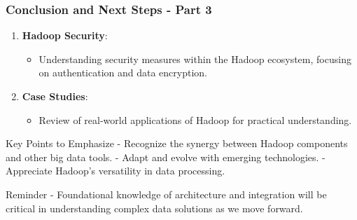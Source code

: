 \documentclass[aspectratio=169]{beamer}
\begin{document}
\begin{frame}[fragile]
    \frametitle{Conclusion and Next Steps - Part 3}
    
    \begin{enumerate}[resume]
        \item \textbf{Hadoop Security}:
        \begin{itemize}
            \item Understanding security measures within the Hadoop ecosystem, focusing on authentication and data encryption.
        \end{itemize}
        
        \item \textbf{Case Studies}:
        \begin{itemize}
            \item Review of real-world applications of Hadoop for practical understanding.
        \end{itemize}
    \end{enumerate}
    
    \begin{block}{Key Points to Emphasize}
    - Recognize the synergy between Hadoop components and other big data tools.
    - Adapt and evolve with emerging technologies.
    - Appreciate Hadoop’s versatility in data processing.
    \end{block}

    \begin{block}{Reminder}
    - Foundational knowledge of architecture and integration will be critical in understanding complex data solutions as we move forward.
    \end{block}
\end{frame}
\end{document}
